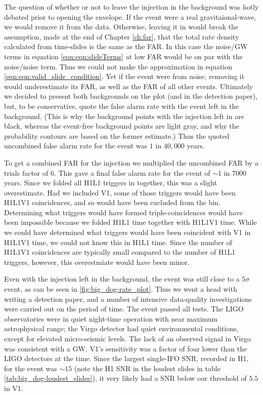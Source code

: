 The question of whether or not to leave the injection in the background was hotly debated prior to opening the envelope. If the event were a real gravitaional-wave, we would remove it from the data. Otherwise, leaving it in would break the assumption, made at the end of Chapter \ref{ch:far}, that the total rate density calculated from time-slides is the same as the \ac{FAR}. In this case the noise/GW terms in equation \ref{eqn:eqn:slideTerms} at low \ac{FAR} would be on par with the noise/noise term. Thus we could not make the approximation in equation \ref{eqn:eqn:valid_slide_condition}. Yet if the event were from noise, removing it would underestimate its \ac{FAR}, as well as the \ac{FAR} of all other events. Ultimately we decided to present both backgrounds on the plot (and in the detection paper), but, to be conservative, quote the false alarm rate with the event left in the background. (This is why the background points with the injection left in are black, whereas the event-free background points are light gray, and why the probability contours are based on the former estimate.) Thus the quoted uncombined false alarm rate for the event was $1$ in $40,000$ years.

To get a combined \ac{FAR} for the injection we multiplied the uncombined \ac{FAR} by a trials factor of 6. This gave a final false alarm rate for the event of $\sim1$ in $7000$ years. Since we folded all H1L1 triggers in together, this was a slight overestimate. Had we included V1, some of those triggers would have been H1L1V1 coincidences, and so would have been excluded from the bin. Determining what triggers would have formed triple-coincidences would have been impossible because we folded H1L1 time together with H1L1V1 time. While we could have determined what triggers would have been coincident with V1 in H1L1V1 time, we could not know this in H1L1 time. Since the number of H1L1V1 coincidences are typically small compared to the number of H1L1 triggers, however, this overestmiate would have been minor.

Even with the injection left in the background, the event was still close
to a $5\sigma$ event, as can be seen in \ref{fig:big_dog-rate_plot}. Thus we
went a head with writing a detection paper, and a number of intensive
data-quality investigations were carried out on the period of time. The event
passed all tests.  The LIGO observatories were in quiet night-time operation
with near maximum astrophysical range; the Virgo detector had quiet
environmental conditions, except for elevated micro-seismic levels. The lack of
an observed signal in Virgo was consistent with a \ac{GW}. V1's sensitivity was
a factor of four lower than the LIGO detectors at the time. Since the largest
single-\ac{IFO} \ac{SNR}, recorded in H1, for the event was $\sim15$ (note the
H1 \ac{SNR} in the loudest slides in table \ref{tab:big_dog-loudest_slides}),
it very likely had a \ac{SNR} below our threshold of $5.5$ in V1.

